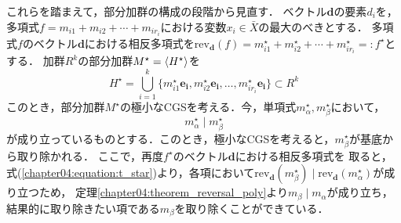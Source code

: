 これらを踏まえて，部分加群の構成の段階から見直す．
ベクトル$\bm{d}$の要素$d_i$を，多項式$f = m_{i1} + m_{i2} + \cdots + m_{ir_i}$における変数$x_i \in \bar{X}$の最大のべきとする．
多項式$f$のベクトル$\bm{d}$における相反多項式を$\mathrm{rev}_{\bm{d}}(f) = m_{i1}^{\star} + m_{i2}^{\star} + \cdots + m_{ir_i}^{\star} =: f^\star$とする．
加群$R^k$の部分加群$M^\star = \langle H^\star \rangle$を
$$H^\star = \bigcup_{i=1}^k \{m_{i1}^{\star}\bm{e_i}, m_{i2}^{\star}\bm{e_i}, \dots, m_{ir_i}^{\star}\bm{e_i}\} \subset R^k$$
このとき，部分加群$M^{\star}$の極小なCGSを考える．今，単項式$m_\alpha^\star, m_\beta^\star$において，
\begin{equation}
	m_\alpha^\star \mid m_\beta^\star \label{chapter04:equation:t_star}
\end{equation}
が成り立っているものとする．このとき，極小なCGSを考えると，$m_\beta^{\star}$が基底から取り除かれる．
ここで，再度$f^\star$のベクトル$\bm{d}$における相反多項式を
取ると，
式(\ref{chapter04:equation:t_star})より，各項において$\mathrm{rev}_{\bm{d}}(m_\beta^\star) \mid \mathrm{rev}_{\bm{d}}(m_\alpha^\star)$が成り立つため，
定理\ref{chapter04:theorem_reversal_poly}より$m_{\beta} \mid m_{\alpha}$が成り立ち，
結果的に取り除きたい項である$m_\beta$を取り除くことができている．







